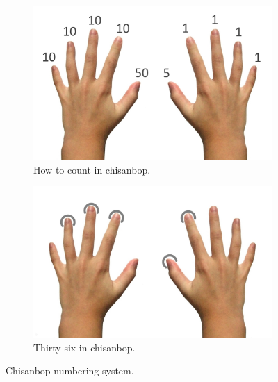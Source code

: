 \begin{figure}[h!t]
    \centering
    \begin{subfigure}{.49\textwidth}
        \centering
        \includegraphics[scale=0.12]{assets/images/chisanbop_numbered.jpg}
        \caption{How to count in chisanbop.}
        \label{fig:chisanbop:system}
    \end{subfigure}
    \begin{subfigure}{.49\textwidth}
        \centering
        \includegraphics[scale=0.09]{assets/images/chisanbop_36.jpg}
        \caption{Thirty-six in chisanbop.}
        \label{fig:chisanbop:36}
    \end{subfigure}
    \caption{Chisanbop numbering system.}
    \label{fig:chisanbop}
\end{figure}

